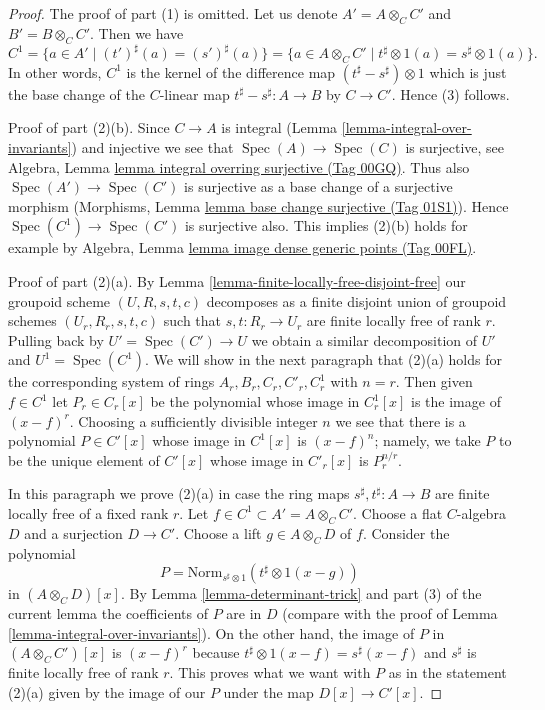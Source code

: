 \documentclass{amsart}
\theoremstyle{plain}
\theoremstyle{definition}
\theoremstyle{remark}
\numberwithin{equation}{subsection}
\def\Spec{\mathop{\mathrm{Spec}}}
\begin{document}
\begin{proof}
The proof of part (1) is omitted. Let us denote $A' = A \otimes_C C'$ and
$B' = B \otimes_C C'$. Then we have
$$
C^1
= \{a \in A' \mid (t')^\sharp(a) = (s')^\sharp(a) \}
= \{a \in A \otimes_C C' \mid t^\sharp \otimes 1(a) = s^\sharp \otimes 1(a) \}.
$$
In other words, $C^1$ is the kernel of the difference map
$(t^\sharp - s^\sharp) \otimes 1$ which is just the base change
of the $C$-linear map $t^\sharp - s^\sharp : A \to B$ by $C \to C'$.
Hence (3) follows.

\medskip\noindent
Proof of part (2)(b). Since $C \to A$ is integral
(Lemma \ref{lemma-integral-over-invariants}) and injective we see that
$\Spec(A) \to \Spec(C)$ is surjective, see
Algebra, Lemma \href{https://stacks.math.columbia.edu/tag/00GQ}{lemma integral overring surjective (Tag 00GQ)}.
Thus also $\Spec(A') \to \Spec(C')$ is surjective
as a base change of a surjective morphism
(Morphisms, Lemma \href{https://stacks.math.columbia.edu/tag/01S1}{lemma base change surjective (Tag 01S1)}).
Hence $\Spec(C^1) \to \Spec(C')$ is surjective also.
This implies (2)(b) holds for example by
Algebra, Lemma \href{https://stacks.math.columbia.edu/tag/00FL}{lemma image dense generic points (Tag 00FL)}.

\medskip\noindent
Proof of part (2)(a). By Lemma \ref{lemma-finite-locally-free-disjoint-free}
our groupoid scheme $(U, R, s, t, c)$ decomposes as a finite disjoint union
of groupoid schemes $(U_r, R_r, s, t, c)$ such that $s, t : R_r \to U_r$
are finite locally free of rank $r$. Pulling back by $U' = \Spec(C') \to U$
we obtain a similar decomposition of $U'$ and $U^1 = \Spec(C^1)$.
We will show in the next paragraph that (2)(a) holds for the corresponding
system of rings $A_r, B_r, C_r, C'_r, C^1_r$ with $n = r$.
Then given $f \in C^1$ let $P_r \in C_r[x]$ be the polynomial
whose image in $C^1_r[x]$ is the image of $(x - f)^r$.
Choosing a sufficiently divisible integer $n$ we see that
there is a polynomial $P \in C'[x]$ whose image in $C^1[x]$ is
$(x - f)^n$; namely, we take $P$ to be the unique element of
$C'[x]$ whose image in $C'_r[x]$ is $P_r^{n/r}$.

\medskip\noindent
In this paragraph we prove (2)(a) in case the ring maps
$s^\sharp, t^\sharp : A \to B$ are finite locally free of a fixed rank $r$.
Let $f \in C^1 \subset A' = A \otimes_C C'$. Choose a flat
$C$-algebra $D$ and a surjection $D \to C'$. Choose a lift
$g \in A \otimes_C D$ of $f$.
Consider the polynomial
$$
P = \text{Norm}_{s^\sharp \otimes 1}(t^\sharp \otimes 1(x - g))
$$
in $(A \otimes_C D)[x]$. By Lemma \ref{lemma-determinant-trick}
and part (3) of the current lemma the coefficients of $P$ are in $D$
(compare with the proof of Lemma \ref{lemma-integral-over-invariants}).
On the other hand, the image of $P$ in $(A \otimes_C C')[x]$ is
$(x - f)^r$ because $t^\sharp \otimes 1(x - f) = s^\sharp(x - f)$
and $s^\sharp$ is finite locally free of rank $r$.
This proves what we want with $P$ as in the statement (2)(a)
given by the image of our $P$ under the map $D[x] \to C'[x]$.
\end{proof}
\end{document}
